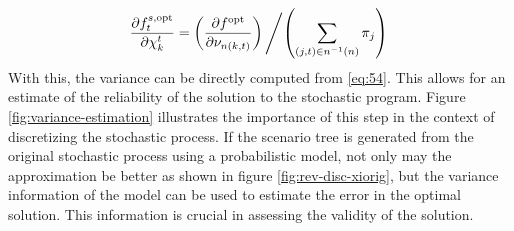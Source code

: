 \begin{equation}
  \label{eq:56}
  \frac{\partial f_t^{s,\mathrm{opt}}}{\partial \chi_{k}^t} = \left(\frac{\partial f^{\mathrm{opt}}}{\partial \nu_{n(k,t)}}\right) \left/ \left(\sum_{(j,t)\in n^{-1}(n)} \pi_j\right)\right.
\end{equation}
With this, the variance can be directly computed from \eqref{eq:54}.
This allows for an estimate of the reliability of the solution to the stochastic program.
Figure \ref{fig:variance-estimation} illustrates the importance of this step in the context of discretizing the stochastic process.
If the scenario tree is generated from the original stochastic process using a probabilistic model, not only may the approximation be better as shown in figure \ref{fig:rev-disc-xiorig}, but the variance information of the model can be used to estimate the error in the optimal solution.
This information is crucial in assessing the validity of the solution.
